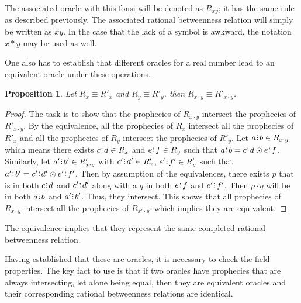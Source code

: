 \documentclass[12pt]{article}
\newtheorem{proposition}{Proposition}[section]
\begin{document}
The associated oracle with this fonsi will be denoted as $R_{xy}$; it has the same rule as described previously. The associated rational betweenness relation will simply be written as $xy$. In the case that the lack of a symbol is awkward, the notation $x * y$ may be used as well. 

One also has to establish that different oracles for a real number lead to an equivalent oracle under these operations. 

\begin{proposition}
    Let $R_x \equiv R'_x$ and $R_y \equiv R'_y$, then $R_{x \cdot y} \equiv R'_{x \cdot y}$.
\end{proposition}

\begin{proof}
The task is to show that the prophecies of $R_{x \cdot y}$ intersect the prophecies of $R'_{x \cdot y}$. By the equivalence, all the prophecies of $R_x$ intersect all the prophecies of $R'_x$ and all the prophecies of $R_y$ intersect the prophecies of $R'_y$. Let $a\rint b \in R_{x \cdot y}$ which means there exists $c\rint d \in R_x$ and $e\rint f \in R_y$ such that $a\rint b = c\rint d \odot e\rint f$. Similarly, let $a'\rint b'\in R'_{x \cdot y}$ with $c'\rint d' \in R'_x$, $e'\rint f' \in R'_y$ such that $a'\rint b' = c'\rint d' \odot e'\rint f'$. Then by assumption of the equivalences, there exists $p$ that is in both $c\rint d$ and $c'\rint d'$ along with a $q$ in both $e\rint f$ and $e'\rint f'$. Then $p \cdot q$ will be in both $a\rint b$ and $a'\rint b'$. Thus, they intersect. This shows that all prophecies of $R_{x \cdot y}$ intersect all the prophecies of $R_{x' \cdot y'}$ which implies they are equivalent. 
\end{proof}

The equivalence implies that they represent the same completed rational betweenness relation.

Having established that these are oracles, it is necessary to check the field properties. The key fact to use is that if two oracles have prophecies that are always intersecting, let alone being equal, then they are equivalent oracles and their corresponding rational betweenness relations are identical. 
\end{document}
